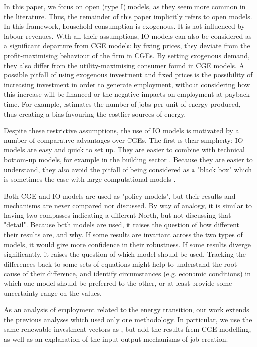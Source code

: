 In this paper, we focus on open (type I) models, as they seem more common in the literature. Thus, the remainder of this paper implicitly refers to open models. In this framework, household consumption is exogenous. It is not influenced by labour revenues. 
With all their assumptions, IO models can also be considered as a significant departure from CGE models: by fixing prices, they deviate from the profit-maximising behaviour of the firm in CGEs. By setting exogenous demand, they also differ from the utility-maximising consumer found in CGE models. A possible pitfall of using exogenous investment and fixed prices is the possibility of increasing investment in order to generate employment, without considering how this increase will be financed or the negative impacts on employment at payback time. For example, \citet{Wei2010} estimates the number of jobs per unit of energy produced, thus creating a bias favouring the costlier sources of energy.

Despite these restrictive assumptions, the use of IO models is motivated by a number of comparative advantages over CGEs. The first is their simplicity: IO models are easy and quick to set up. They are easier to combine with technical bottom-up models, for example in the building sector \citep{Scott2008, Yushchenko2016}. Because they are easier to understand, they also avoid the pitfall of being considered as a "black box" which is sometimes the case with large computational models \citep{Faehn2015}.

Both CGE and IO models are used as "policy models", but their results and mechanisms are never compared nor discussed. By way of analogy, it is similar to having two compasses indicating a different North, but not discussing that "detail". Because both models are used, it raises the question of how different their results are, and why. 
If some results are invariant across the two types of models, it would give more confidence in their robustness. 
If some results diverge significantly, it raises the question of which model should be used. Tracking the differences back to some sets of equations  might help to understand the root cause of their difference, and identify circumstances (e.g. economic conditions) in which one model should be preferred to the other, or at least provide some uncertainty range on the values. 

As an analysis of employment related to the energy transition, our work extends the previous analyses which used only one methodology. In particular, we use the same renewable investment vectors as \citet{Garrett2017}, but add the results from CGE modelling, as well as an explanation of the input-output mechanisms of job creation.

